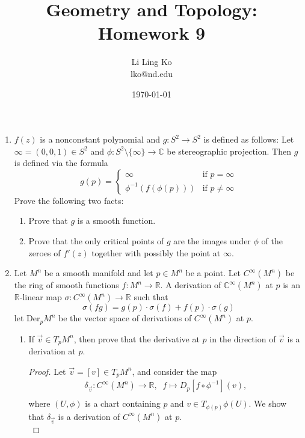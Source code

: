 \documentclass{article}
\begin{document}
\title{Geometry and Topology: Homework 9}
\author{Li Ling Ko\\ lko@nd.edu}
\date{\today}
\maketitle

\begin{enumerate}[label={\bf Q\arabic*:}]
  \item $f(z)$ is a nonconstant polynomial and $g:S^2\to S^2$ is defined as
    follows: Let $\infty=(0,0,1)\in S^2$ and
    $\phi:S^2\setminus\{\infty\}\to\mathbb{C}$ be stereographic projection.
    Then $g$ is defined via the formula
    \[g(p)=\begin{cases} \infty &\mbox{if }p=\infty\\ \phi^{-1}(f(\phi(p)))
      &\mbox{if }p\not=\infty\end{cases}\]
    Prove the following two facts:

    \begin{enumerate}
      \item Prove that $g$ is a smooth function.
      \item Prove that the only critical points of $g$ are the images under
        $\phi$ of the zeroes of $f'(z)$ together with possibly the point at
        $\infty$.
    \end{enumerate}

  \item Let $M^n$ be a smooth manifold and let $p\in M^n$ be a point. Let
    $C^\infty(M^n)$ be the ring of smooth functions $f:M^n\to\mathbb{R}$. A
    derivation of $\mathbb{C}^\infty(M^n)$ at $p$ is an $\mathbb{R}$-linear
    map $\sigma:C^\infty(M^n)\to\mathbb{R}$ such that
    \[\sigma(fg)=g(p)\cdot \sigma(f)+f(p)\cdot\sigma(g)\] let
    $\text{Der}_pM^n$ be the vector space of derivations of $C^\infty(M^n)$
    at $p$.

    \begin{enumerate}
      \item If $\vec{v}\in T_pM^n$, then prove that the derivative at $p$
        in the direction of $\vec{v}$ is a derivation at $p$.
        \begin{proof}
          Let $\vec{v}=[v]\in T_pM^n$, and consider the map
          \begin{align*}
            \delta_{\vec{v}}:C^\infty(M^n)\rightarrow\mathbb{R},\;\; f\mapsto
            D_p[f\circ\phi^{-1}](v), \\
          \end{align*}
          where $(U,\phi)$ is a chart containing $p$ and $v\in
          T_{\phi(p)}\phi(U)$. We show that $\delta_{\vec{v}}$ is a
          derivation of $C^\infty(M^n)$ at $p$. \\


\end{proof}
\end{enumerate}
\end{enumerate}
\end{document}
